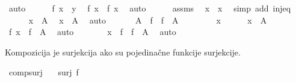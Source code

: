 \begin{isabellebody}
\begin{exercise}[subtitle=Svojstva funkcija]
\ auto\isanewline
\ \ \ \ \isamarkupfalse%
\ {\isacartoucheopen}f\ x\ {\isacharequal}{\kern0pt}\ y{\isacartoucheclose}\ \isamarkupfalse%
\ {\isachardoublequoteopen}f\ x\ {\isacharequal}{\kern0pt}\ f\ x{\isacharprime}{\kern0pt}{\isachardoublequoteclose}\ \isamarkupfalse%
\ auto\isanewline
\ \ \ \ \isamarkupfalse%
\ assms\ \isamarkupfalse%
\ {\isachardoublequoteopen}x\ {\isacharequal}{\kern0pt}\ x{\isacharprime}{\kern0pt}{\isachardoublequoteclose}\ \isamarkupfalse%
\ {\isacharparenleft}{\kern0pt}simp\ add{\isacharcolon}{\kern0pt}\ inj{\isacharunderscore}{\kern0pt}eq{\isacharparenright}{\kern0pt}\isanewline
\ \ \ \ \isamarkupfalse%
\ {\isacartoucheopen}x{\isacharprime}{\kern0pt}\ {\isasymin}\ A{\isacartoucheclose}\ \isamarkupfalse%
\ {\isachardoublequoteopen}x\ {\isasymin}\ A{\isachardoublequoteclose}\ \isamarkupfalse%
\ auto\isanewline
\ \ \isamarkupfalse%
\isanewline
{}\isamarkupfalse%
\isanewline
\ \ \isamarkupfalse%
\ {\isachardoublequoteopen}A\ {\isasymsubseteq}\ f\ {\isacharminus}{\kern0pt}{\isacharbackquote}{\kern0pt}\ f\ {\isacharbackquote}{\kern0pt}\ A{\isachardoublequoteclose}\isanewline
\ \ \isamarkupfalse%
\isanewline
\ \ \ \ \isamarkupfalse%
\ x\isanewline
\ \ \ \ \isamarkupfalse%
\ {\isachardoublequoteopen}x\ {\isasymin}\ A{\isachardoublequoteclose}\isanewline
\ \ \ \ \isamarkupfalse%
\ \isamarkupfalse%
\ {\isachardoublequoteopen}f\ x\ {\isasymin}\ f\ {\isacharbackquote}{\kern0pt}\ A{\isachardoublequoteclose}\ \isamarkupfalse%
\ auto\isanewline
\ \ \ \ \isamarkupfalse%
\ \isamarkupfalse%
\ {\isachardoublequoteopen}x\ {\isasymin}\ f\ {\isacharminus}{\kern0pt}{\isacharbackquote}{\kern0pt}\ f\ {\isacharbackquote}{\kern0pt}\ A{\isachardoublequoteclose}\ \isamarkupfalse%
\ auto\isanewline
\ \ \isamarkupfalse%
\isanewline
{}\isamarkupfalse%
%
\endisatagproof
{\isafoldproof}%
%
\isadelimproof
%
\endisadelimproof
%
\begin{isamarkuptext}%
Kompozicija je surjekcija
      ako su pojedinačne funkcije surjekcije.%
\end{isamarkuptext}\isamarkuptrue%
\isamarkupfalse%
\ comp{\isacharunderscore}{\kern0pt}surj{\isacharcolon}{\kern0pt}\isanewline
\ \ \ {\isachardoublequoteopen}surj\ f{\isachardoublequoteclose}\isanewline

\end{exercise}
\end{isabellebody}
